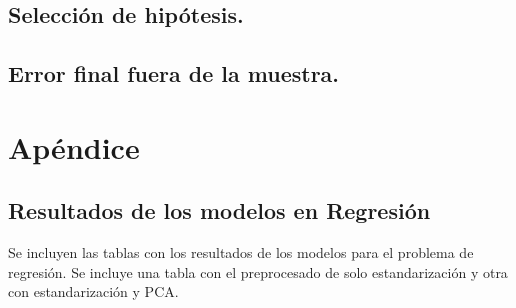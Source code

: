 \documentclass[a4paper, 20pt]{article}
\begin{document}
\subsection{Selección de hipótesis.}

\subsection{Error final fuera de la muestra.}



\newpage
\printbibliography

\newpage

\section{Apéndice}

\subsection{Resultados de los modelos en Regresión}
\label{apend:regresion}

Se incluyen las tablas con los resultados de los modelos para el problema de regresión. Se incluye una tabla con el preprocesado de solo estandarización y otra con estandarización y PCA.
\end{document}
